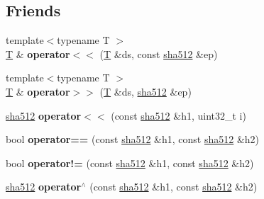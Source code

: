 \subsection*{Friends}
\begin{DoxyCompactItemize}
\item 
\mbox{\label{classfc_1_1sha512_a4b462b1c5818c74c3d5359e4ad989235}} 
{\footnotesize template$<$typename T $>$ }\\\mbox{\hyperlink{struct_t}{T}} \& {\bfseries operator$<$$<$} (\mbox{\hyperlink{struct_t}{T}} \&ds, const \mbox{\hyperlink{classfc_1_1sha512}{sha512}} \&ep)
\item 
\mbox{\label{classfc_1_1sha512_aa8bc9f467abf1546a02e21d69de7826c}} 
{\footnotesize template$<$typename T $>$ }\\\mbox{\hyperlink{struct_t}{T}} \& {\bfseries operator$>$$>$} (\mbox{\hyperlink{struct_t}{T}} \&ds, \mbox{\hyperlink{classfc_1_1sha512}{sha512}} \&ep)
\item 
\mbox{\label{classfc_1_1sha512_a4d802e3d693af721c4f69def59e07662}} 
\mbox{\hyperlink{classfc_1_1sha512}{sha512}} {\bfseries operator$<$$<$} (const \mbox{\hyperlink{classfc_1_1sha512}{sha512}} \&h1, uint32\+\_\+t i)
\item 
\mbox{\label{classfc_1_1sha512_a9e4ae326ff88f5480a089474bcfa40c5}} 
bool {\bfseries operator==} (const \mbox{\hyperlink{classfc_1_1sha512}{sha512}} \&h1, const \mbox{\hyperlink{classfc_1_1sha512}{sha512}} \&h2)
\item 
\mbox{\label{classfc_1_1sha512_a6d5596380065c7a5d94c24ee6d8a0b8a}} 
bool {\bfseries operator!=} (const \mbox{\hyperlink{classfc_1_1sha512}{sha512}} \&h1, const \mbox{\hyperlink{classfc_1_1sha512}{sha512}} \&h2)
\item 
\mbox{\label{classfc_1_1sha512_a1fd23cc764b2105b2af0d3f95bd53a01}} 
\mbox{\hyperlink{classfc_1_1sha512}{sha512}} {\bfseries operator$^\wedge$} (const \mbox{\hyperlink{classfc_1_1sha512}{sha512}} \&h1, const \mbox{\hyperlink{classfc_1_1sha512}{sha512}} \&h2)
\item 
\mbox{\label{classfc_1_1sha512_a6481f74cab63c6fa5cb1b1e3607a0756}} 

\end{DoxyCompactItemize}
